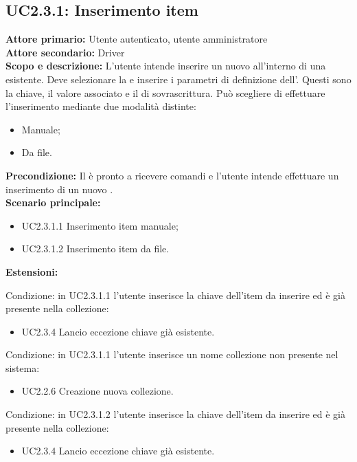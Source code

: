 \documentclass{scalatekids-article}
\begin{document}
\subsection{UC2.3.1: Inserimento item}

\textbf{Attore primario:} Utente autenticato, utente amministratore\\
\textbf{Attore secondario:} Driver\\
\textbf{Scopo e descrizione:} L'utente intende inserire un nuovo  all'interno di una  esistente. Deve selezionare la  e inserire i parametri di definizione dell'. Questi sono la chiave, il valore associato e il  di sovrascrittura. Può scegliere di effettuare l'inserimento mediante due modalità distinte:
\begin{itemize}
\item Manuale;
\item Da file.
\end{itemize}
\textbf{Precondizione:} Il  è pronto a ricevere comandi e l'utente intende effettuare un inserimento di un nuovo .\\
\textbf{Scenario principale:}
\begin{itemize}
\item UC2.3.1.1 Inserimento item manuale;
\item UC2.3.1.2 Inserimento item da file.
\end{itemize}
\textbf{Estensioni:}
\item Condizione: in UC2.3.1.1  l'utente inserisce la chiave dell'item da inserire ed è già presente nella collezione:
  \begin{itemize}
  \item UC2.3.4 Lancio eccezione chiave già esistente.
  \end{itemize}
\item Condizione: in UC2.3.1.1 l'utente inserisce un nome collezione non presente nel sistema:
  \begin{itemize}
  \item UC2.2.6 Creazione nuova collezione.
  \end{itemize}
\item Condizione: in UC2.3.1.2  l'utente inserisce la chiave dell'item da inserire ed è già presente nella collezione:
  \begin{itemize}
  \item UC2.3.4 Lancio eccezione chiave già esistente.
  \end{itemize}
\end{document}
